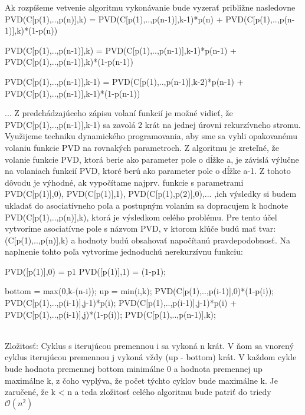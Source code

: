 \documentclass[paper=a4, fontsize=11pt]{scrartcl} %
\numberwithin{equation}{section} %
\numberwithin{figure}{section} %
\numberwithin{table}{section} %
\begin{document}
Ak rozpíšeme vetvenie algoritmu vykonávanie bude vyzerať približne nasledovne
PVD(C[p(1),..,p(n)],k) = PVD(C[p(1),..,p(n-1)],k-1)*p(n) + PVD(C[p(1),..,p(n-1)],k)*(1-p(n))

PVD(C[p(1),..,p(n-1)],k) = PVD(C[p(1),..,p(n-1)],k-1)*p(n-1) + PVD(C[p(1),..,p(n-1)],k)*(1-p(n-1))

PVD(C[p(1),..,p(n-1)],k-1) = PVD(C[p(1),..,p(n-1)],k-2)*p(n-1) + PVD(C[p(1),..,p(n-1)],k-1)*(1-p(n-1))

...
Z predchádzajúceho zápisu volaní funkcií je možné vidieť, že PVD(C[p(1),..,p(n-1)],k-1) sa zavolá 2 krát na jednej úrovni rekurzívneho stromu.
Využijeme techniku dynamického programovania, aby sme sa vyhli opakovanému volaniu funkcie PVD na rovnakých parametroch.
Z algoritmu je zreteľné, že volanie funkcie PVD, ktorá berie ako parameter pole o dĺžke a, je závislá výlučne na volaniach funkcií PVD, ktoré berú ako parameter pole o dĺžke a-1.
Z tohoto dôvodu je výhodné, ak vypočítame najprv. funkcie s parametrami PVD(C[p(1)],0), PVD(C[p(1)],1), PVD(C[p(1),p(2)],0),... ,ich výsledky si budem ukladať do asociatívneho poľa a postupným volaním sa dopracujem k hodnote PVD(C[p(1),..,p(n)],k), ktorá je výsledkom celého problému.
Pre tento účel vytvoríme asociatívne pole s názvom PVD, v ktorom kľúče budú mať tvar:
(C[p(1),..,p(n)],k)
a hodnoty budú obsahovať napočítanú pravdepodobnosť.
Na naplnenie tohto poľa vytvoríme jednoduchú nerekurzívnu funkciu:


\begin{algorithmic}[1]
		\State PVD([p(1)],0) = p1
		\State PVD([p(1)],1) = (1-p1);

			\State bottom = max(0,k-(n-i));
			\State up = min(i,k);
					\State PVD(C[p(1),..,p(i-1)],0)*(1-p(i));
				\Else {}
					\State PVD(C[p(1),..,p(i-1)],j-1)*p(i);
				\Else 
					\State PVD(C[p(1),..,p(i-1)],j-1)*p(i) + PVD(C[p(1),..,p(i-1)],j)*(1-p(i));
				\EndIf \EndIf
			\EndFor
		\EndFor
		\State \Return PVD(C[p(1),..,p(n-1)],k);
	\EndFunction
\end{algorithmic}
\ \\
Zložitosť:
Cyklus s iterujúcou premennou i sa vykoná n krát.
V ňom sa vnorený cyklus iterujúcou premennou j vykoná vždy (up - bottom) krát.
V každom cykle bude hodnota premennej bottom minimálne 0 a hodnota premennej up maximálne k, z čoho vyplýva, že počet týchto cyklov bude maximálne k.
Je zaručené, že k < n a teda zložitosť celého algoritmu bude patriť do triedy $\mathcal{O}(n^2)$
\end{document}
